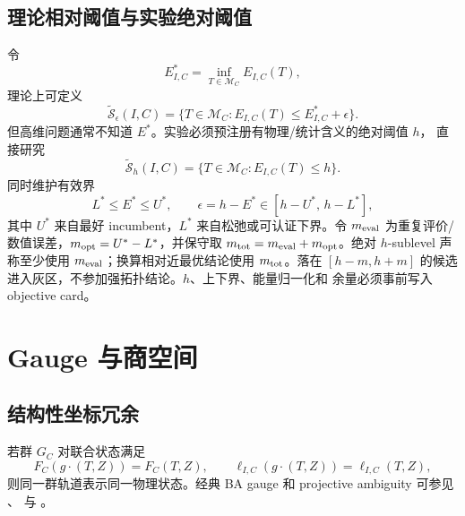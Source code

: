 \documentclass[UTF8,a4paper,11pt]{ctexart}
\newcommand{\Sset}{\mathcal S}
\newcommand{\Mspace}{\mathcal M}
\begin{document}
\subsection{理论相对阈值与实验绝对阈值}

令
\begin{equation}
  E^*_{I,C}=\inf_{T\in\Mspace_C}E_{I,C}(T),
\end{equation}
理论上可定义
\begin{equation}
  \widetilde{\Sset}_\epsilon(I,C)
  =\{T\in\Mspace_C:E_{I,C}(T)\le E^*_{I,C}+\epsilon\}.
  \label{eq:prequotient-sublevel}
\end{equation}
但高维问题通常不知道 $E^*$。实验必须预注册有物理/统计含义的绝对阈值 $h$，
直接研究
\begin{equation}
  \widetilde{\Sset}_h(I,C)
  =\{T\in\Mspace_C:E_{I,C}(T)\le h\}.
  \label{eq:absolute-sublevel}
\end{equation}
同时维护有效界
\begin{equation}
  L^*\le E^*\le U^*,\qquad
  \epsilon=h-E^*\in[h-U^*,\,h-L^*],
\end{equation}
其中 $U^*$ 来自最好 incumbent，$L^*$ 来自松弛或可认证下界。令
$m_{\rm eval}$ 为重复评价/数值误差，$m_{\rm opt}=U^*-L^*$，并保守取
$m_{\rm tot}=m_{\rm eval}+m_{\rm opt}$。绝对 $h$-sublevel 声称至少使用
$m_{\rm eval}$；换算相对近最优结论使用 $m_{\rm tot}$。落在
$[h-m,h+m]$ 的候选进入灰区，不参加强拓扑结论。$h$、上下界、能量归一化和
余量必须事前写入 objective card。

\section{Gauge 与商空间}

\subsection{结构性坐标冗余}

若群 $G_C$ 对联合状态满足
\begin{equation}
  F_C(g\!\cdot\!(T,Z))=F_C(T,Z),\qquad
  \ell_{I,C}(g\!\cdot\!(T,Z))=\ell_{I,C}(T,Z),
\end{equation}
则同一群轨道表示同一物理状态。经典 BA gauge 和 projective ambiguity 可参见
\citet{triggs2000bundle}、\citet{hartley1994projective} 与
\citet{hartley2004multiple}。
\end{document}
